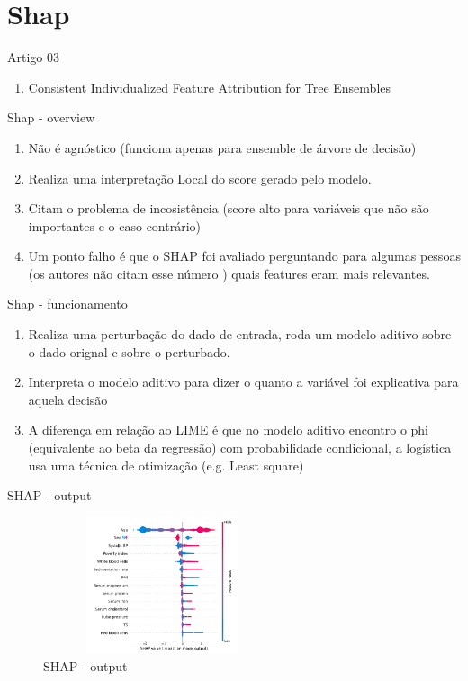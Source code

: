 \section{Shap}

\begin{frame}
	\begin{block}{Artigo 03}
	\begin{enumerate}
		\item Consistent Individualized Feature Attribution for Tree Ensembles \cite{SHAP}
	\end{enumerate}
	\end{block}
\end{frame}


\begin{frame}
	\begin{block}{Shap - overview}
		\begin{enumerate}
			\item Não é agnóstico (funciona apenas para ensemble de árvore de decisão)
			\item Realiza uma interpretação Local do score gerado pelo modelo.
			\item Citam o problema de incosistência (score alto para variáveis que não são importantes e o caso contrário) 
			\item Um ponto falho é que o SHAP foi avaliado perguntando para algumas pessoas (os autores não citam esse número ) quais features eram mais relevantes.
		\end{enumerate}
	\end{block}
\end{frame}

\begin{frame}
	\begin{block}{Shap - funcionamento}
			\begin{enumerate}
				\item Realiza uma perturbação do dado de entrada, roda um modelo aditivo sobre o dado orignal e sobre o perturbado.
				\item Interpreta o modelo aditivo para dizer o quanto a variável foi explicativa para aquela decisão
				\item A diferença em relação ao LIME é que no modelo aditivo encontro o phi (equivalente ao beta da regressão) com probabilidade condicional, a logística usa uma técnica de otimização  (e.g. Least square)
			\end{enumerate}
	\end{block}
\end{frame}

\begin{frame}
	\begin{block}{SHAP - output}
		\begin{figure}[!htb]
			\centering	  				
			\includegraphics[height=4cm, width = 7cm]{./pic/shapModel.png}
			\caption{SHAP - output \cite{SHAP}}
			\label{fig_ds_process}
		\end{figure}	
	\end{block}
\end{frame}

